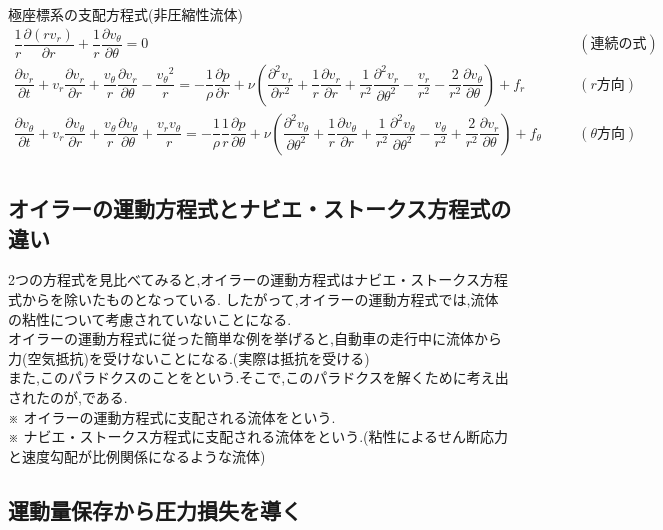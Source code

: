 \documentclass[a4paper]{jsarticle}
\begin{document}
\begin{itembox}[l]{極座標系の支配方程式\quad(非圧縮性流体)}
    \begin{eqnarray*}
        \dfrac{1}{r}\dfrac{\partial \left(rv_r\right)}{\partial r}+\dfrac{1}{r}\dfrac{\partial v_\theta}{\partial \theta}=0\quad&&(連続の式)\\
        \dfrac{\partial v_r}{\partial t}+v_r\dfrac{\partial v_r}{\partial r}+\dfrac{v_\theta}{r}\dfrac{\partial v_r}{\partial \theta}-\dfrac{{v_\theta}^2}{r}=-\dfrac{1}{\rho}\dfrac{\partial p}{\partial r}+\nu \left(\dfrac{\partial^2 v_r}{\partial r^2}+\dfrac{1}{r}\dfrac{\partial v_r}{\partial r}+\dfrac{1}{r^2}\dfrac{\partial^2 v_r}{\partial \theta^2}-\dfrac{v_r}{r^2}-\dfrac{2}{r^2}\dfrac{\partial v_\theta}{\partial \theta}\right)+f_r\quad&&(r方向)\\
        \dfrac{\partial v_\theta}{\partial t}+v_r\dfrac{\partial v_\theta}{\partial r}+\dfrac{v_\theta}{r}\dfrac{\partial v_\theta}{\partial \theta}+\dfrac{v_rv_\theta}{r}=-\dfrac{1}{\rho}\dfrac{1}{r}\dfrac{\partial p}{\partial \theta}+\nu\left(\dfrac{\partial^2 v_\theta}{\partial \theta^2}+\dfrac{1}{r}\dfrac{\partial v_\theta}{\partial r}+\dfrac{1}{r^2}\dfrac{\partial^2 v_\theta}{\partial \theta^2}-\dfrac{v_\theta}{r^2}+\dfrac{2}{r^2}\dfrac{\partial v_r}{\partial \theta}\right)+f_\theta\quad&&(\theta 方向)\\
    \end{eqnarray*}
\end{itembox}
\subsection{オイラーの運動方程式とナビエ・ストークス方程式の違い}
2つの方程式を見比べてみると,オイラーの運動方程式はナビエ・ストークス方程式からを除いたものとなっている.
したがって,オイラーの運動方程式では,流体の粘性について考慮されていないことになる.\\
オイラーの運動方程式に従った簡単な例を挙げると,自動車の走行中に流体から力(空気抵抗)を受けないことになる.(実際は抵抗を受ける)\\
また,このパラドクスのことをという.そこで,このパラドクスを解くために考え出されたのが,である.\\
※ オイラーの運動方程式に支配される流体をという.\\
※ ナビエ・ストークス方程式に支配される流体をという.(粘性によるせん断応力と速度勾配が比例関係になるような流体)
\subsection{運動量保存から圧力損失を導く}
\end{document}
